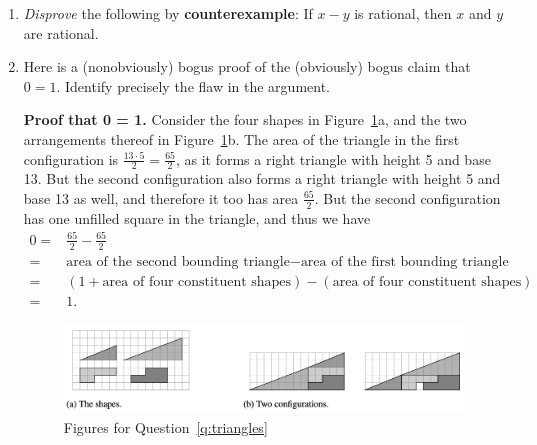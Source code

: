\documentclass[11pt, oneside]{article}   	%
\newcommand{\ints}{\mathbb{Z}}
\begin{document}
\begin{enumerate}
\item \textit{Disprove} the following by \textbf{counterexample}: If $x−y$ is rational, then $x$ and $y$ are rational.

%
%

\item 
\label{q:triangles}  Here is a (nonobviously) bogus proof of the (obviously) bogus claim that $0=1$.
Identify precisely the flaw in the argument. 

\textbf{Proof that 0 = 1.} 
Consider the four shapes in Figure~\ref{fig:triangles}a, 
and the two arrangements thereof in  Figure~\ref{fig:triangles}b. 
The area of the triangle in the first configuration is $\frac{13\cdot5}{2} = \frac{65}{2}$, 
as it forms a right triangle with height 5 and base 13. 
But the second configuration also forms a right triangle with height 5 and base 13 as well, and therefore it too has area $\frac{65}{2}$. 
But the second configuration has one unfilled square in the triangle, and thus we have
\[
\begin{aligned}
0 =& \frac{65}{2} - \frac{65}{2}\\
=& \text{area of the second bounding triangle} - \text{area of the first bounding triangle}\\
 =& (1 + \text{area of four constituent shapes}) - (\text{area of four constituent shapes})\\
 =& 1.
 \end{aligned}
 \]

 
 \begin{figure}[h!]
\begin{center}
\includegraphics[width=\columnwidth]{DS2-HW2-triangles}
\caption{Figures for Question~\ref{q:triangles}}
\label{fig:triangles}
\end{center}
\end{figure}


\end{enumerate}
\end{document}
